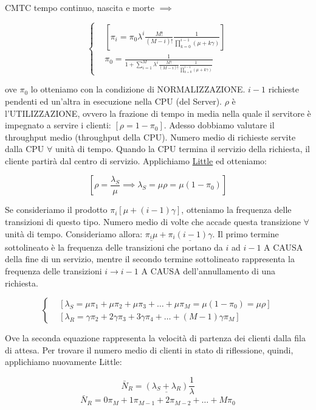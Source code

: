 CMTC tempo continuo, nascita e morte $\implies$

\[
	\left\{
	\begin{aligned}
	&[\pi_i=\pi_0 \lambda^i \frac{M!}{(M-i)!} \frac{1}{\prod_{k=0}^{i-1}{(\mu+k\gamma)}}]\\
	&\pi_0 = \frac{1}{1+\sum_{i=1}^M{\lambda^i \frac{M!}{(M-i)!} \frac{1}{\prod_{k=0}^{i-1}{(\mu+k\gamma)}}}}
	\end{aligned}
	\right.
\]

ove $\pi_0$ lo otteniamo con la condizione di NORMALIZZAZIONE. $i-1$ richieste pendenti ed un'altra in esecuzione nella CPU (del Server). $\rho$ è l'UTILIZZAZIONE, ovvero la frazione di tempo in media nella quale il servitore è impegnato a servire i clienti: $[\rho=1-\pi_0]$. Adesso dobbiamo valutare il throughput medio (throughput della CPU). Numero medio di richieste servite dalla CPU $\forall$ unità di tempo. Quando la CPU termina il servizio della richiesta, il cliente partirà dal centro di servizio. Applichiamo \underline{Little} ed otteniamo:

\[
	[\rho=\frac{\lambda_S}{\mu} \implies \lambda_S = \mu\rho = \mu(1-\pi_0)]
\]

Se consideriamo il prodotto $\pi_i[\mu+(i-1)\gamma]$, otteniamo la frequenza delle transizioni di questo tipo. Numero medio di volte che accade questa transizione $\forall$ unità di tempo. Consideriamo allora: $\underline{\pi_i\mu} + \underline{\pi_i(i-1)\gamma}$. Il primo termine sottolineato è la frequenza delle transizioni che portano da $i$ ad $i-1$ A CAUSA della fine di un servizio, mentre il secondo termine sottolineato rappresenta la frequenza delle transizioni $i\rightarrow i-1$ A CAUSA dell'annullamento di una richiesta. 

\[
	\left\{
	\begin{aligned}
	&[\lambda_S = \mu\pi_1 + \mu\pi_2 + \mu\pi_3 + \dots + \mu\pi_M = \mu(1-\pi_0) = \mu\rho]\\
	&[\lambda_R = \gamma\pi_2 + 2\gamma\pi_3 + 3\gamma\pi_4 + \dots + (M-1)\gamma\pi_M]
	\end{aligned}
	\right.
\]

Ove la seconda equazione rappresenta la velocità di partenza dei clienti dalla fila di attesa. Per trovare il numero medio di clienti in stato di riflessione, quindi, applichiamo nuovamente Little:

\[
	\bar{N}_R = \underline{(\lambda_S+\lambda_R)} \frac{1}{\lambda}
\]
\[
	\bar{N}_R = 0 \pi_M + 1\pi_{M-1} + 2\pi_{M-2} + \dots + M\pi_0
\]

